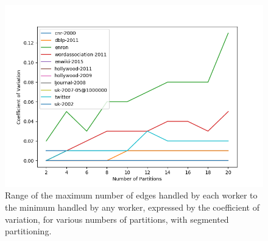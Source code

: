 \begin{figure}
	\centering
	\includegraphics[width=\columnwidth]{../good_plots/range_as_cv_modulo.png}
	\caption{Range of the maximum number of edges handled by each worker to the 
		minimum handled by any worker, expressed by the coefficient of 
		variation, for various numbers of partitions, with segmented 
		partitioning.}
	\label{fig:cv_range}
\end{figure}
